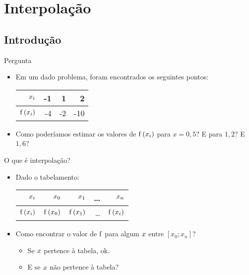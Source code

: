\section{Interpolação}

\subsection{Introdução}

\begin{frame}{Pergunta}
\begin{itemize}[<+->]
  \item Em um dado problema, foram encontrados os seguintes pontos:
\begin{tabular}{r|rrr}
\bfseries $x_i$ & \hspace{0.3cm} -1 & \hspace{0.3cm} 1 & \hspace{0.3cm} 2 \\
\hline
\bfseries $\mathrm{f}\left(x_i\right)$ & -4 & -2 & -10 \\
\end{tabular}
  \item Como poderíamos estimar os valores de $\mathrm{f}\left(x_i\right)$ para $x=0,5$? E para $1,2$? E $1,6$?
\end{itemize}
\end{frame}

\begin{frame}{O que é interpolação?}
\begin{itemize}
  \item Dado o tabelamento:\\
\begin{tabular}{r|rrrr}
\bfseries $x_i$ & \hspace{0.3cm} $x_0$ & \hspace{0.3cm} $x_1$ & \hspace{0.3cm} \ldots & \hspace{0.3cm} $x_n$ \\
\hline
\bfseries $\mathrm{f}\left(x_i\right)$ & $\mathrm{f}\left(x_0\right)$ & $\mathrm{f}\left(x_1\right)$ & \ldots & $\mathrm{f}\left(x_i\right)$ \\
\end{tabular}
  \item Como encontrar o valor de $\mathrm{f}$ para algum $x$ entre $[x_0; x_n]$?
  \begin{itemize}[<+->]
    \item Se $x$ pertence à tabela, ok.
    \item E se $x$ não pertence à tabela?
  \end{itemize}
\end{itemize}
\end{frame}

